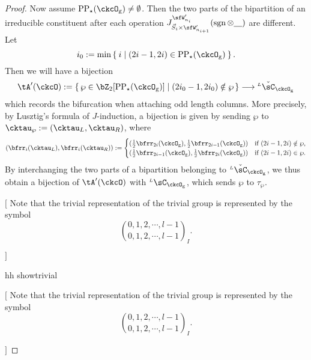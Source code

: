 \documentclass[12pt,a4paper]{amsart}
\newcommand{\trivial}[2][]{\if\relax\detokenize{#1}\relax
  {%
      \color{orange} \vspace{0em} $[$  #2 $]$
      \color{black}
  }
  \else
\ifx#1h
\ifcsname showtrivial\endcsname
{%
    \color{orange} \vspace{0em}  $[$ #2 $]$
    \color{black}
}
\fi
\else {\red Wrong argument!} \fi
\fi
}
\newcommand{\sgn}{\operatorname{sgn}}
\numberwithin{equation}{section}
\theoremstyle{remark}
\def\half{{\tfrac{1}{2}}}
\def\LC{{}^{\scriptscriptstyle L}\sC}
\def\ckLC{{}^{\scriptscriptstyle L}\check{\sC}}
\def\ckLC{{}^{\scriptscriptstyle L}\check\sC}
\def\CPPs{\mathrm{PP}_{\star}}
\begin{document}
\begin{proof}
{    Now assume $\CPPs(\ckcO_{\mathrm g})\neq \emptyset$. Then the two parts of the
    bipartition of an irreducible constituent after each operation
    $J_{\vec{S}_{i}\times \sfW'_{n_{i+1}}}^{\sfW'_{n_{i}}}(\sgn \otimes \underline{\ \ \ })$ are different. Let
    \[i_{0}:= \min\Set{i| (2i-1,2i)\in \CPPs(\ckcO_{\mathrm g})}.\]
    Then we will have a bijection
    \[
      \tA'(\ckcO):= \set{\wp\in \bZ_{2}[\CPPs(\ckcO_{\mathrm g})]|(2i_{0}-1,2i_{0})\notin \wp} \longrightarrow \ckLC_{\ckcO_{\mathrm g}}
    \]
    which records the bifurcation when attaching odd length columns. More precisely, by Lusztig's formula of $J$-induction, a bijection is given by sending
      $\wp$ to $\cktau_{\wp}:= (\cktau_{L},\cktau_{R})$, where
    \[
      (\bfrr_{i}(\cktau_{L}),\bfrr_{i}(\cktau_{R})) := \begin{cases} (\half\bfrr_{2i}(\ckcO_{\mathrm g}),\half\bfrr_{2i-1}(\ckcO_{\mathrm g}))
        & \text{if } (2i-1,2i)\notin \wp ,\\
        (\half\bfrr_{2i-1}(\ckcO_{\mathrm g}),\half\bfrr_{2i}(\ckcO_{\mathrm g}))
        & \text{if } (2i-1,2i)\in \wp .\\
      \end{cases}
    \]
    By interchanging the two parts of a bipartition belonging to $\ckLC_{\ckcO_{\mathrm g}}$, we thus obtain a bijection of $\tA'(\ckcO)$ with $\LC_{\ckcO_{\mathrm g}}$, which sends $\wp$ to $\tau_{\wp}$.


    \trivial[h]{ Note that the trivial representation of the trivial group is
      represented by the symbol
      \[
        \binom{0,1, 2, \cdots, l-1}{0,1,2, \cdots, l-1}_{I}.
      \]

}}
\end{proof}
\end{document}
